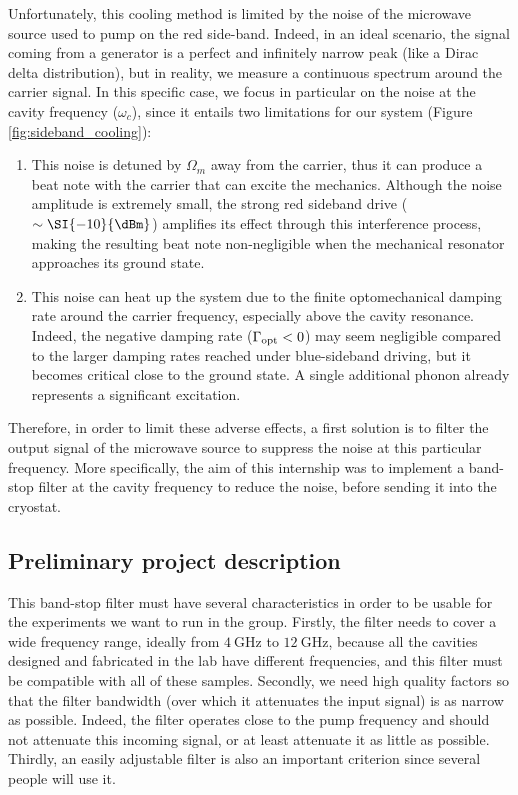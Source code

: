 \documentclass[11pt,a4pape,longbibliography]{article}
\begin{document}
Unfortunately, this cooling method is limited by the noise of the microwave source used to pump on the red side-band. Indeed, in an ideal scenario, the signal coming from a generator is a perfect and infinitely  narrow peak (like a Dirac delta distribution), but in reality, we measure a continuous spectrum around the carrier signal. In this specific case, we focus in particular on the noise at the cavity frequency ($\omega_c$), since it entails two limitations for our system (Figure \ref{fig:sideband_cooling}):
\begin{enumerate}
	\item This noise is detuned by $\Omega_m$ away from the carrier, thus it can produce a beat note with the carrier that can excite the mechanics. Although the noise amplitude is extremely small, the strong red sideband drive ($\sim\SI{-10}{\dBm}$) amplifies its effect through this interference process, making the resulting beat note non-negligible when the mechanical resonator approaches its ground state.
	\item This noise can heat up the system due to the finite optomechanical damping rate around the carrier frequency, especially  above the cavity resonance. Indeed, the negative damping rate ($\Gamma_{\rm opt}<0$) may seem negligible compared to the larger damping rates reached under blue-sideband driving, but it becomes critical close to the ground state. A single additional phonon already represents a significant excitation.\\
\end{enumerate}

Therefore, in order to limit these adverse effects, a first solution is to filter the output signal of the microwave source to suppress the noise at this particular frequency. More specifically, the aim of this internship was to implement a band-stop filter at the cavity frequency to reduce the noise, before sending it into the cryostat.

\subsection{Preliminary project description}

This band-stop filter must have several characteristics in order to be usable for the experiments we want to run in the group. Firstly, the filter needs to cover a wide frequency range, ideally from $\SI{4}{\GHz}$ to $\SI{12}{\GHz}$, because all the cavities designed and fabricated in the lab have different frequencies, and this filter must be compatible with all of these samples. Secondly, we need high quality factors so that the filter bandwidth (over which it attenuates the input signal) is as narrow as possible. Indeed, the filter operates close to the pump frequency and should not attenuate this incoming signal, or at least attenuate it as little as possible. Thirdly, an easily adjustable filter is also an important criterion since several people will use it.\\
\end{document}
